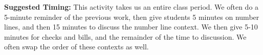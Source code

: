 \documentclass{ximera}
\begin{document}
\begin{instructorNotes}
{\bf Suggested Timing:} This activity takes us an entire class period.  We often do a 5-minute reminder of the previous work, then give students 5 minutes on number lines, and then 15 minutes to discuss the number line context.  We then give 5-10 minutes for checks and bills, and the remainder of the time to discussion.  We often swap the order of these contexts as well.
\end{instructorNotes}
\end{document}
